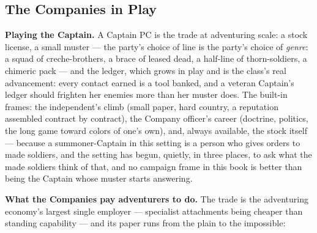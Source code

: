 \subsection{The Companies in Play}

\textbf{Playing the Captain.} A Captain PC is the trade at adventuring scale: a stock license, a small muster --- the party's choice of line is the party's choice of \textit{genre}: a squad of creche-brothers, a brace of leased dead, a half-line of thorn-soldiers, a chimeric pack --- and the ledger, which grows in play and is the class's real advancement: every contact earned is a tool banked, and a veteran Captain's ledger should frighten her enemies more than her muster does. The built-in frames: the independent's climb (small paper, hard country, a reputation assembled contract by contract), the Company officer's career (doctrine, politics, the long game toward colors of one's own), and, always available, the stock itself --- because a summoner-Captain in this setting is a person who gives orders to made soldiers, and the setting has begun, quietly, in three places, to ask what the made soldiers think of that, and no campaign frame in this book is better than being the Captain whose muster starts answering.

\textbf{What the Companies pay adventurers to do.} The trade is the adventuring economy's largest single employer --- specialist attachments being cheaper than standing capability --- and its paper runs from the plain to the impossible:

